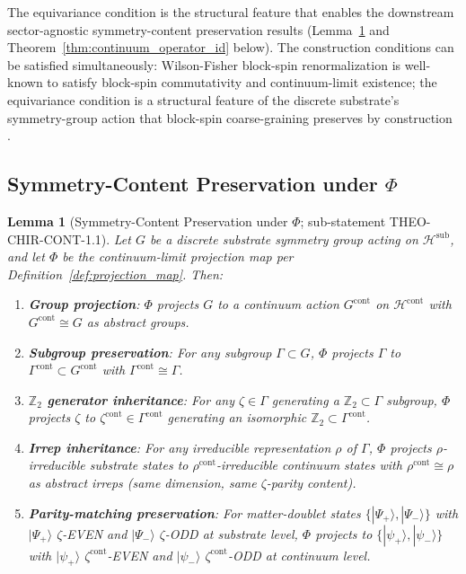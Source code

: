 \documentclass[11pt,letterpaper]{article}
\newtheorem{lemma}[theorem]{Lemma}
\begin{document}
The equivariance condition is the structural feature that enables the downstream sector-agnostic symmetry-content preservation results (Lemma~\ref{lem:symmetry_preservation} and Theorem~\ref{thm:continuum_operator_id} below). The construction conditions can be satisfied simultaneously: Wilson-Fisher block-spin renormalization is well-known to satisfy block-spin commutativity and continuum-limit existence; the equivariance condition is a structural feature of the discrete substrate's symmetry-group action that block-spin coarse-graining preserves by construction \cite{WilsonKogut}.

\subsection{Symmetry-Content Preservation under $\Phi$}
\label{sec:symmetry_preservation}

\begin{lemma}[Symmetry-Content Preservation under $\Phi$; sub-statement THEO-CHIR-CONT-1.1]
\label{lem:symmetry_preservation}
Let $G$ be a discrete substrate symmetry group acting on $\mathcal{H}^{\text{sub}}$, and let $\Phi$ be the continuum-limit projection map per Definition~\ref{def:projection_map}. Then:
\begin{enumerate}[leftmargin=*]
\item \textbf{Group projection}: $\Phi$ projects $G$ to a continuum action $G^{\text{cont}}$ on $\mathcal{H}^{\text{cont}}$ with $G^{\text{cont}} \cong G$ as abstract groups.
\item \textbf{Subgroup preservation}: For any subgroup $\Gamma \subset G$, $\Phi$ projects $\Gamma$ to $\Gamma^{\text{cont}} \subset G^{\text{cont}}$ with $\Gamma^{\text{cont}} \cong \Gamma$.
\item \textbf{$\mathbb{Z}_2$ generator inheritance}: For any $\zeta \in \Gamma$ generating a $\mathbb{Z}_2 \subset \Gamma$ subgroup, $\Phi$ projects $\zeta$ to $\zeta^{\text{cont}} \in \Gamma^{\text{cont}}$ generating an isomorphic $\mathbb{Z}_2 \subset \Gamma^{\text{cont}}$.
\item \textbf{Irrep inheritance}: For any irreducible representation $\rho$ of $\Gamma$, $\Phi$ projects $\rho$-irreducible substrate states to $\rho^{\text{cont}}$-irreducible continuum states with $\rho^{\text{cont}} \cong \rho$ as abstract irreps (same dimension, same $\zeta$-parity content).
\item \textbf{Parity-matching preservation}: For matter-doublet states $\{|\Psi_+\rangle, |\Psi_-\rangle\}$ with $|\Psi_+\rangle$ $\zeta$-EVEN and $|\Psi_-\rangle$ $\zeta$-ODD at substrate level, $\Phi$ projects to $\{|\psi_+\rangle, |\psi_-\rangle\}$ with $|\psi_+\rangle$ $\zeta^{\text{cont}}$-EVEN and $|\psi_-\rangle$ $\zeta^{\text{cont}}$-ODD at continuum level.
\end{enumerate}
\end{lemma}
\end{document}
